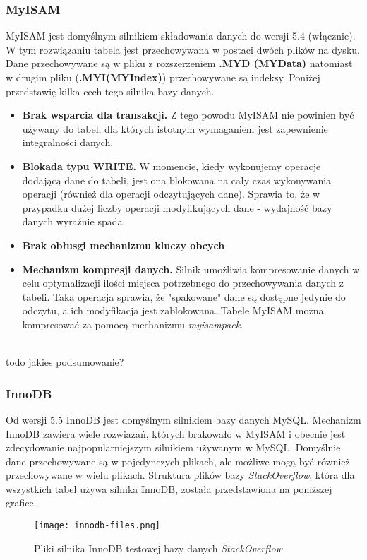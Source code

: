 \subsubsection{MyISAM}
MyISAM jest domyślnym silnikiem składowania danych do wersji 5.4 (włącznie). W tym rozwiązaniu tabela jest przechowywana w postaci dwóch plików na dysku. Dane przechowywane są w pliku z rozszerzeniem \textbf{.MYD (MYData)}
natomiast w drugim pliku (\textbf{.MYI(MYIndex)}) przechowywane są indeksy. Poniżej przedstawię kilka cech tego silnika bazy danych.
\begin{itemize}
	\item \textbf{Brak wsparcia dla transakcji.} Z tego powodu MyISAM nie powinien być używany do tabel, dla których istotnym wymaganiem jest zapewnienie integralności danych.
	\item \textbf{Blokada typu WRITE.}  W momencie, kiedy wykonujemy operacje dodającą dane do tabeli, jest ona blokowana na cały czas wykonywania operacji (również dla operacji odczytujących dane). Sprawia to, że w przypadku dużej liczby operacji modyfikujących dane - wydajność bazy danych wyraźnie spada.
	\item \textbf{Brak obłusgi mechanizmu kluczy obcych}
	\item \textbf{Mechanizm kompresji danych.} Silnik umożliwia kompresowanie danych w celu optymalizacji ilości miejsca potrzebnego do przechowywania danych z tabeli. Taka operacja sprawia, że "spakowane" dane są dostępne jedynie do odczytu, a ich modyfikacja jest zablokowana.	Tabele MyISAM można kompresować za pomocą mechanizmu \textit{myisampack}. 
\end{itemize}

\\todo jakies podsumowanie?

\subsubsection{InnoDB}
Od wersji 5.5 InnoDB jest domyślnym silnikiem bazy danych MySQL. Mechanizm InnoDB zawiera wiele rozwiazań, których brakowało w MyISAM i obecnie jest zdecydowanie najpopularniejszym silnikiem używanym w MySQL. Domyślnie dane przechowywane są w pojedynczych plikach, ale możliwe mogą być również przechowywane w wielu plikach. Struktura plików bazy \textit{StackOverflow}, która dla wszystkich tabel używa silnika InnoDB, została przedstawiona na poniższej grafice. 
\begin{figure}[!h]
	\caption{Pliki silnika InnoDB testowej bazy danych \textit{StackOverflow}}
	\centering
	\texttt{[image: innodb-files.png]}
	\label{fig:label}
\end{figure}

